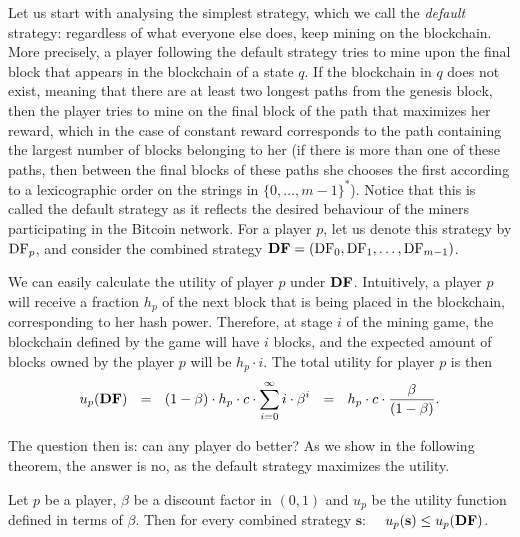 \documentclass[a4paper,english,cleveref, autoref,numberwithinsect]{lipics-v2019}
\newcommand{\bs}{\mathbf{s}}
\newcommand{\bchain}{\text{bc}}
\newcommand{\cdf}{\text{\rm {\bf DF}}}
\newcommand{\df}{\text{\rm DF}}
\begin{document}
Let us start with analysing the %
simplest strategy, which we call the \emph{default} strategy: regardless of what everyone else does, keep mining on the blockchain. 
More precisely, a player following the default strategy tries to mine upon the final block that appears in the blockchain of a state $q$. If the blockchain in $q$ does not exist, meaning that there are at least two longest paths from the genesis block, then the player tries to mine on the final block of the path that maximizes her reward, which in the case of constant 
reward corresponds to the path containing the largest number of blocks belonging to her  
(if there is more than one of these paths, then between the final blocks of these paths she chooses the first according to a lexicographic order on the strings in $\{0, \ldots, m-1\}^*$). 
Notice that this is called the default strategy as it reflects the desired behaviour of the miners participating in the Bitcoin network. For a player $p$, let us denote this strategy 
by $\df_p$, and consider the combined strategy $\cdf = (\df_0,\df_1,\dots,\df_{m-1})$. 

We can easily calculate the utility of player $p$ under $\cdf$. Intuitively, a player $p$ will receive a fraction $h_p$ of the next block that is being placed in the blockchain, corresponding to her hash power. Therefore, at stage $i$ of the mining game, the blockchain defined by the game will have $i$ blocks, and the expected amount of blocks owned by the player $p$ will be $h_p\cdot i$. The total utility for player $p$ is then
$$u_p(\cdf) \ \ = \ \ (1 - \beta) \cdot h_p \cdot c\cdot \sum_{i=0}^{\infty}i \cdot \beta^{i} \ \ = \ \ h_p\cdot c \cdot \frac{\beta}{(1-\beta)}.$$


The question then is: can any player do better? As we show in the following theorem, the answer is no, as the default strategy maximizes the utility. 
\begin{theorem}\label{thm-conts_dom_str}
Let $p$ be a player, $\beta$ be a discount factor in $(0,1)$ and $u_p$ be the utility function defined in terms of $\beta$. Then for every combined strategy $\bs$: \ \ $u_p(\bs) \leq u_p(\cdf)$.
\end{theorem} 
\end{document}
